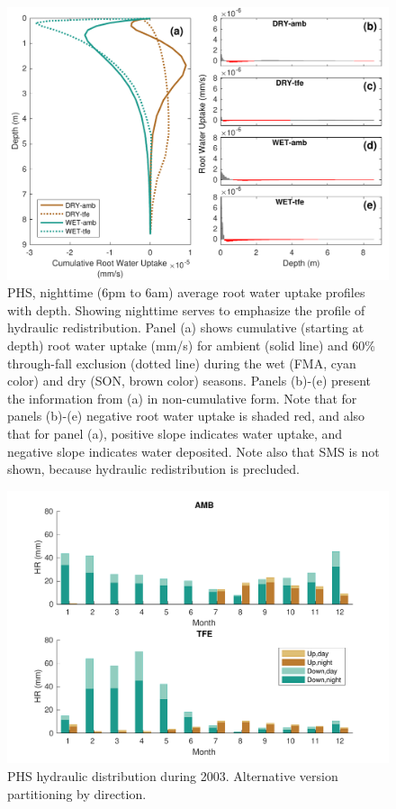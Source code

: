 \documentclass[draft,linenumbers]{agujournal}
\begin{document}
    \begin{figure}[h]
     \centering
     \includegraphics[width=30pc]{../figs2/fig10.pdf}
     \caption{PHS, nighttime (6pm to 6am) average root water uptake profiles with depth. 
     Showing nighttime serves to emphasize the profile of hydraulic redistribution.
     Panel (a) shows cumulative (starting at depth) root water uptake (mm/s) for ambient (solid line) and 60\% through-fall exclusion (dotted line)
     during the wet (FMA, cyan color) and dry (SON, brown color) seasons. 
     Panels (b)-(e) present the information from (a) in non-cumulative form. 
     Note that for panels (b)-(e) negative root water uptake is shaded red, and also that for panel (a), 
     positive slope indicates water uptake, and negative slope indicates water deposited.
     Note also that SMS is not shown, because hydraulic redistribution is precluded.}
     \label{supp:hr}
  \end{figure}
  \clearpage
  
      \begin{figure}[h]
     \centering
     \includegraphics[width=30pc]{../figs2/supphr.pdf}
     \caption{PHS hydraulic distribution during 2003. Alternative version partitioning by direction.}
     \label{supp:hr2}
  \end{figure}
  \clearpage
  
\end{document}
